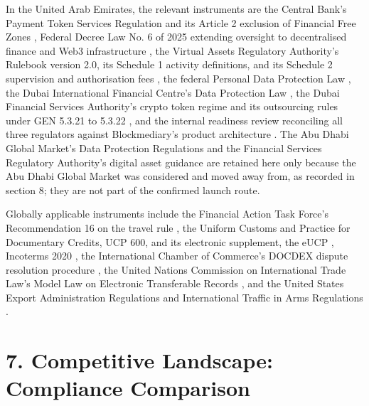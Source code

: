 \documentclass[12pt, a4paper]{article}
\begin{document}
In the United Arab Emirates, the relevant instruments are the Central Bank's Payment
Token Services Regulation and its Article 2 exclusion of Financial Free Zones
\citep{cbuaeptsr2024, cbuaeptsrarticle2}, Federal Decree Law No. 6 of 2025 extending
oversight to decentralised finance and Web3 infrastructure \citep{uaefdl62025}, the Virtual
Assets Regulatory Authority's Rulebook version 2.0, its Schedule 1 activity definitions,
and its Schedule 2 supervision and authorisation fees \citep{vararulebook2025,
vararulebook2025activities, vararulebook2025fees}, the federal Personal Data Protection Law
\citep{pdpl2021}, the Dubai International Financial Centre's Data Protection Law
\citep{difcdplaw2020}, the Dubai Financial Services Authority's crypto token regime and its
outsourcing rules under GEN 5.3.21 to 5.3.22 \citep{difcdfsa2022, dfsaoutsourcing}, and the
internal readiness review reconciling all three regulators against Blockmediary's product
architecture \citep{difcvarareport2026}. The Abu Dhabi Global Market's Data Protection
Regulations and the Financial Services Regulatory Authority's digital asset guidance
\citep{adgmdpr2021, adgmfsra2026} are retained here only because the Abu Dhabi Global
Market was considered and moved away from, as recorded in section 8; they are not part of
the confirmed launch route.

Globally applicable instruments include the Financial Action Task Force's Recommendation
16 on the travel rule \citep{fatf2025}, the Uniform Customs and Practice for Documentary
Credits, UCP 600, and its electronic supplement, the eUCP \citep{ucp600, eucp}, Incoterms
2020 \citep{incoterms2020}, the International Chamber of Commerce's DOCDEX dispute
resolution procedure \citep{iccdocdex}, the United Nations Commission on International
Trade Law's Model Law on Electronic Transferable Records \citep{uncitralmletr}, and the
United States Export Administration Regulations and International Traffic in Arms
Regulations \citep{usear, usitar}.

\section*{7. Competitive Landscape: Compliance Comparison}
\end{document}

